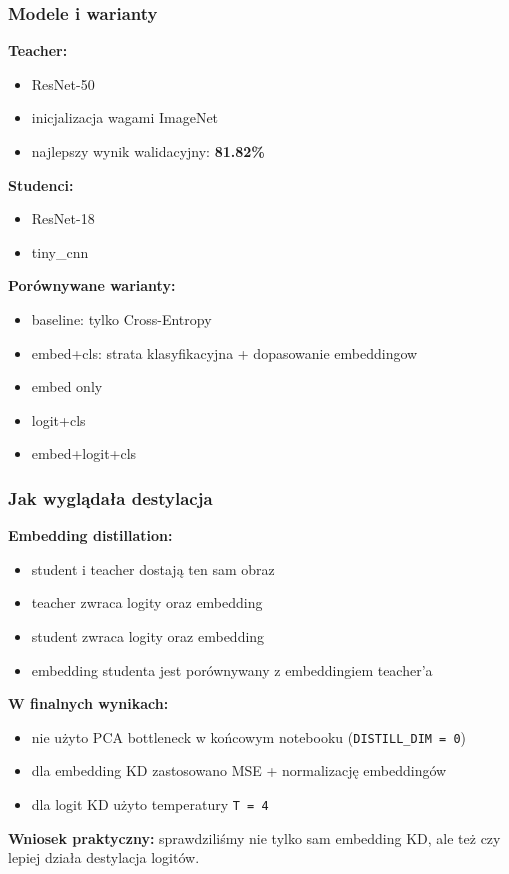 \documentclass{beamer}
\begin{document}
\begin{frame}
\frametitle{Modele i warianty}
\textbf{Teacher:}
\begin{itemize}
    \item ResNet-50
    \item inicjalizacja wagami ImageNet
    \item najlepszy wynik walidacyjny: \textbf{81.82\%}
\end{itemize}
\vspace{0.2cm}

\textbf{Studenci:}
\begin{itemize}
    \item ResNet-18
    \item tiny\_cnn
\end{itemize}
\vspace{0.2cm}

\textbf{Porównywane warianty:}
\begin{itemize}
    \item baseline: tylko Cross-Entropy
    \item embed+cls: strata klasyfikacyjna + dopasowanie embeddingow
    \item embed only
    \item logit+cls
    \item embed+logit+cls
\end{itemize}
\end{frame}

\begin{frame}
\frametitle{Jak wyglądała destylacja}
\textbf{Embedding distillation:}
\begin{itemize}
    \item student i teacher dostają ten sam obraz
    \item teacher zwraca logity oraz embedding
    \item student zwraca logity oraz embedding
    \item embedding studenta jest porównywany z embeddingiem teacher'a
\end{itemize}
\vspace{0.2cm}

\textbf{W finalnych wynikach:}
\begin{itemize}
    \item nie użyto PCA bottleneck w końcowym notebooku (\texttt{DISTILL\_DIM = 0})
    \item dla embedding KD zastosowano MSE + normalizację embeddingów
    \item dla logit KD użyto temperatury \texttt{T = 4}
\end{itemize}
\vspace{0.2cm}

\textbf{Wniosek praktyczny:} sprawdziliśmy nie tylko sam embedding KD, ale też czy lepiej działa destylacja logitów.
\end{frame}
\end{document}
